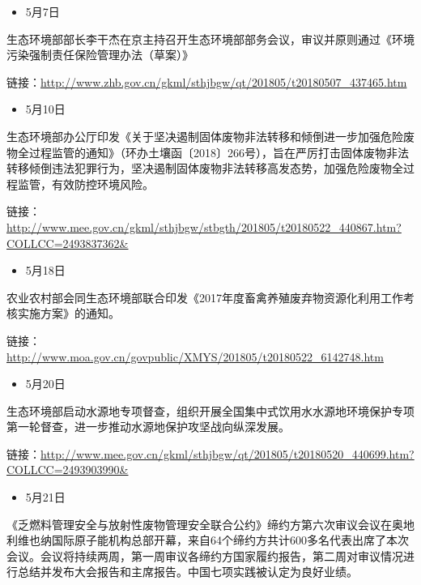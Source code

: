 \documentclass[]{book}
\providecommand{\tightlist}{%
  \setlength{\itemsep}{0pt}\setlength{\parskip}{0pt}}
\begin{document}
\begin{itemize}
\tightlist
\item
  5月7日
\end{itemize}

生态环境部部长李干杰在京主持召开生态环境部部务会议，审议并原则通过《环境污染强制责任保险管理办法（草案）》

链接：\url{http://www.zhb.gov.cn/gkml/sthjbgw/qt/201805/t20180507_437465.htm}

\begin{itemize}
\tightlist
\item
  5月10日
\end{itemize}

生态环境部办公厅印发《关于坚决遏制固体废物非法转移和倾倒进一步加强危险废物全过程监管的通知》（环办土壤函〔2018〕266号），旨在严厉打击固体废物非法转移倾倒违法犯罪行为，坚决遏制固体废物非法转移高发态势，加强危险废物全过程监管，有效防控环境风险。

链接：\url{http://www.mee.gov.cn/gkml/sthjbgw/stbgth/201805/t20180522_440867.htm?COLLCC=2493837362\&}

\begin{itemize}
\tightlist
\item
  5月18日
\end{itemize}

农业农村部会同生态环境部联合印发《2017年度畜禽养殖废弃物资源化利用工作考核实施方案》的通知。

链接：\url{http://www.moa.gov.cn/govpublic/XMYS/201805/t20180522_6142748.htm}

\begin{itemize}
\tightlist
\item
  5月20日
\end{itemize}

生态环境部启动水源地专项督查，组织开展全国集中式饮用水水源地环境保护专项第一轮督查，进一步推动水源地保护攻坚战向纵深发展。

链接：\url{http://www.mee.gov.cn/gkml/sthjbgw/qt/201805/t20180520_440699.htm?COLLCC=2493903990\&}

\begin{itemize}
\tightlist
\item
  5月21日
\end{itemize}

《乏燃料管理安全与放射性废物管理安全联合公约》缔约方第六次审议会议在奥地利维也纳国际原子能机构总部开幕，来自64个缔约方共计600多名代表出席了本次会议。会议将持续两周，第一周审议各缔约方国家履约报告，第二周对审议情况进行总结并发布大会报告和主席报告。中国七项实践被认定为良好业绩。
\end{document}
